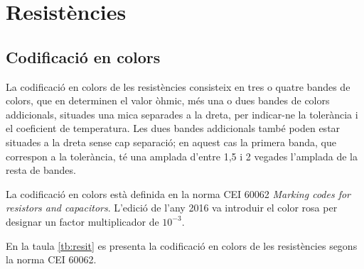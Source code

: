 \chapter{Resistències}

\section{Codificació en colors} \label{sec:resistencies-colors}

La codificació en colors  de les resistències
consisteix en tres o quatre bandes de colors, que en determinen el  valor òhmic, més una o dues bandes de colors addicionals,  situades una mica separades a la dreta, per indicar-ne la tolerància i el coeficient de temperatura. Les dues bandes addicionals també poden estar situades a la dreta sense cap separació; en aquest cas la primera banda, que correspon a la tolerància, té una amplada d'entre 1,5 i 2 vegades l'amplada de la resta de bandes.

La codificació en colors està definida en la norma CEI 60062 \textit{Marking codes for resistors and capacitors}. L'edició de l'any 2016  va introduir el color rosa per designar un factor multiplicador de $10^{-3}$.

En la taula \vref{tb:resit} es presenta la codificació en colors de les resistències segons la  norma CEI 60062.

